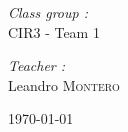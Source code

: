     \begin{center} \Large
        \emph{Class group :}\\
        \textsc{CIR3} - Team 1 \\
    \end{center}
    
    \begin{center} \Large
        \emph{Teacher :}\\
        Leandro \textsc{Montero}
    \end{center}
    
    \vfill
    
\begin{center} \Large
        \today
\end{center}
    
\newpage